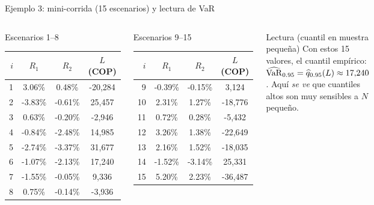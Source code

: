 \documentclass[aspectratio=1610, 9pt]{beamer}
\begin{document}
\begin{frame}{Ejemplo 3: mini-corrida (15 escenarios) y lectura de VaR}
\scriptsize
\begin{columns}[T]
\begin{block}{Escenarios 1--8}
\centering
\setlength{\tabcolsep}{4pt}
\begin{tabular}{@{}rccc@{}}
\toprule
$i$ & $R_1$ & $R_2$ & $L$ (COP) \\
\midrule
1 & 3.06\% & 0.48\% & -20,284 \\
2 & -3.83\% & -0.61\% & 25,457 \\
3 & 0.63\% & -0.20\% & -2,946 \\
4 & -0.84\% & -2.48\% & 14,985 \\
5 & -2.74\% & -3.37\% & 31,677 \\
6 & -1.07\% & -2.13\% & 17,240 \\
7 & -1.55\% & -0.05\% & 9,336 \\
8 & 0.75\% & -0.14\% & -3,936 \\
\bottomrule
\end{tabular}
\end{block}

\begin{block}{Escenarios 9--15}
\centering
\setlength{\tabcolsep}{4pt}
\begin{tabular}{@{}rccc@{}}
\toprule
$i$ & $R_1$ & $R_2$ & $L$ (COP) \\
\midrule
9 & -0.39\% & -0.15\% & 3,124 \\
10 & 2.31\% & 1.27\% & -18,776 \\
11 & 0.72\% & 0.28\% & -5,432 \\
12 & 3.26\% & 1.38\% & -22,649 \\
13 & 2.16\% & 1.52\% & -18,035 \\
14 & -1.52\% & -3.14\% & 25,331 \\
15 & 5.20\% & 2.23\% & -36,487 \\
\bottomrule
\end{tabular}
\end{block}

\begin{alertblock}{Lectura (cuantil en muestra pequeña)}
Con estos 15 valores, el cuantil empírico:
$\widehat{\mathrm{VaR}}_{0.95}=\widehat{q}_{0.95}(L)\approx 17{,}240$.
Aquí \emph{se ve} que cuantiles altos son muy sensibles a $N$ pequeño.
\end{alertblock}
\end{columns}
\end{frame}
\end{document}
